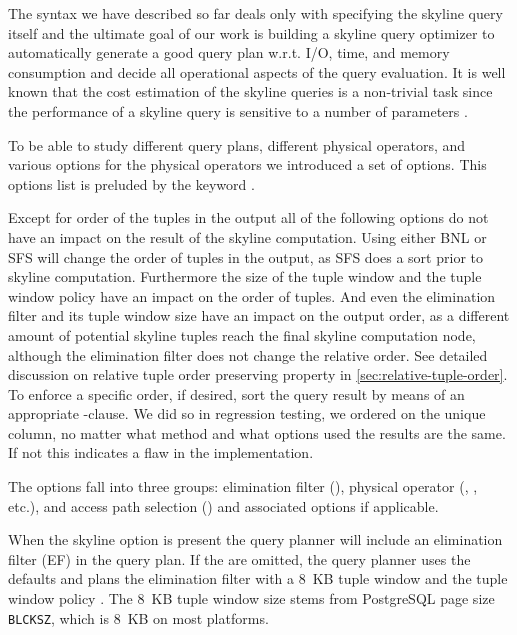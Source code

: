 The syntax we have described so far deals only with specifying the
skyline query itself and the ultimate goal of our work is building a
skyline query optimizer to automatically generate a good query plan
w.r.t. I/O, time, and memory consumption and decide all operational
aspects of the query evaluation.  It is well known that the cost
estimation of the skyline queries is a non-trivial task
\citep{Chaudhuri2006} since the performance of a skyline query is
sensitive to a number of parameters \citep{Godfrey2007}.

To be able to study different query plans, different physical
operators, and various options for the physical operators we
introduced a set of options. This options list is preluded by the
keyword .

Except for order of the tuples in the output all of the following
options do not have an impact on the result of the skyline
computation. Using either BNL or SFS will change the order of tuples in
the output, as SFS does a sort prior to skyline
computation. Furthermore the size of the tuple window and the tuple
window policy have an impact on the order of tuples. And even the
elimination filter and its tuple window size have an impact on the
output order, as a different amount of potential skyline tuples reach
the final skyline computation node, although the elimination filter
does not change the relative order.  See detailed discussion on
relative tuple order preserving property in
\autoref{sec:relative-tuple-order}.  
To enforce a specific order, if
desired, sort the query result by means of an appropriate
-clause.  
We did so in regression testing, we
ordered on the unique  column, no matter what method and
what options used the results are the same. If not this indicates a
flaw in the implementation.

The options fall into three groups: elimination filter
(), physical operator (, ,
etc.), and access path selection () and associated
options if applicable.

When the skyline option  is present the query planner
will include an elimination filter (EF) in the query plan.
If the
 are omitted, the query planner uses the defaults
and plans the elimination filter with a 8~KB tuple window and the
tuple window policy . The 8~KB tuple window size
stems from PostgreSQL page size \texttt{BLCKSZ}, which is 8~KB on most
platforms.

